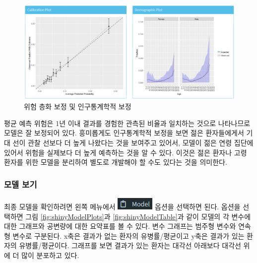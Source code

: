 \documentclass[10.5pt]{book}
\theoremstyle{definition}
\theoremstyle{definition}
\theoremstyle{definition}
\theoremstyle{remark}
\begin{document}
\begin{figure}

{\centering \includegraphics[width=1\linewidth]{images/PatientLevelPrediction/shiny/shinyPerformanceCal} 

}

\caption{위험 층화 보정 및 인구통계학적 보정}\label{fig:shinyPerformanceCal}
\end{figure}

평균 예측 위험은 1년 이내 결과를 경험한 관측된 비율과 일치하는 것으로
나타나므로 모델은 잘 보정되어 있다. 흥미롭게도 인구통계학적 보정을 보면
젊은 환자들에게서 기대 선이 관찰 선보다 더 높게 나왔다는 것을 보여주고
있어서, 모델이 젊은 연령 집단에 있어서 위험을 실제보다 더 높게 예측하는
것을 알 수 있다. 이것은 젊은 환자나 고령 환자를 위한 모델을 분리하여
별도로 개발해야 할 수도 있다는 것을 의미한다.

\subsubsection*{모델 보기}\label{-}

최종 모델을 확인하려면 왼쪽 메뉴에서
\includegraphics{images/PatientLevelPrediction/modelButton.png} 옵션을
선택하면 된다. 옵션을 선택하면 그림 \ref{fig:shinyModelPlots}과
\ref{fig:shinyModelTable}과 같이 모델의 각 변수에 대한 그래프와 공변량에
대한 요약표를 볼 수 있다. 변수 그래프는 범주형 변수와 연속형 변수로
구분된다. x축은 결과가 없는 환자의 유병률/평균이고 y축은 결과가 있는
환자의 유병률/평균이다. 그래프를 보면 결과가 있는 환자는 대각선 아래보다
대각선 위에 더 많이 분포하고 있다.
\end{document}
